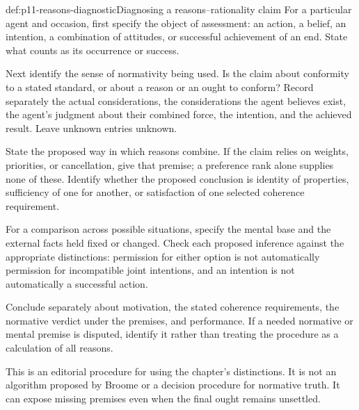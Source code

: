 \begin{hbmethod}{def:p11-reasons-diagnostic}{Diagnosing a reasons--rationality claim}
For a particular agent and occasion, first specify the object of assessment:
an action, a belief, an intention, a combination of attitudes, or successful
achievement of an end. State what counts as its occurrence or success.

Next identify the sense of normativity being used. Is the claim about
conformity to a stated standard, or about a reason or an ought to conform?
Record separately the actual considerations, the considerations the agent
believes exist, the agent's judgment about their combined force, the
intention, and the achieved result. Leave unknown entries unknown.

State the proposed way in which reasons combine. If the claim relies on
weights, priorities, or cancellation, give that premise; a preference rank
alone supplies none of these. Identify whether the proposed conclusion is
identity of properties, sufficiency of one for another, or satisfaction
of one selected coherence requirement.

For a comparison across possible situations, specify the mental base and
the external facts held fixed or changed. Check each proposed inference
against the appropriate distinctions: permission for either option is not
automatically permission for incompatible joint intentions, and an intention
is not automatically a successful action.

Conclude separately about motivation, the stated coherence requirements,
the normative verdict under the premises, and performance. If a needed
normative or mental premise is disputed, identify it rather than treating
the procedure as a calculation of all reasons.
\end{hbmethod}

This is an editorial procedure for using the chapter's distinctions.
It is not an algorithm proposed by Broome or a decision procedure for
normative truth. It can expose missing premises even when the final ought
remains unsettled.

